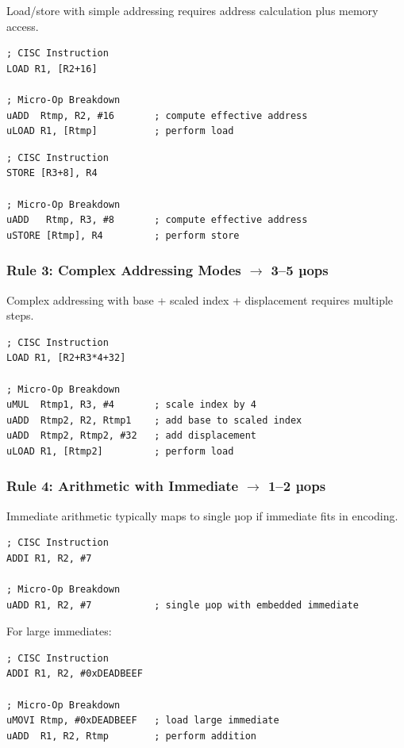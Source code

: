 \documentclass[12pt]{article}
\begin{document}
Load/store with simple addressing requires address calculation plus memory access.

\begin{lstlisting}
; CISC Instruction
LOAD R1, [R2+16]

; Micro-Op Breakdown
uADD  Rtmp, R2, #16       ; compute effective address
uLOAD R1, [Rtmp]          ; perform load
\end{lstlisting}

\begin{lstlisting}
; CISC Instruction
STORE [R3+8], R4

; Micro-Op Breakdown
uADD   Rtmp, R3, #8       ; compute effective address
uSTORE [Rtmp], R4         ; perform store
\end{lstlisting}

\subsubsection{Rule 3: Complex Addressing Modes $\rightarrow$ 3--5 µops}

Complex addressing with base + scaled index + displacement requires multiple steps.

\begin{lstlisting}
; CISC Instruction
LOAD R1, [R2+R3*4+32]

; Micro-Op Breakdown
uMUL  Rtmp1, R3, #4       ; scale index by 4
uADD  Rtmp2, R2, Rtmp1    ; add base to scaled index
uADD  Rtmp2, Rtmp2, #32   ; add displacement
uLOAD R1, [Rtmp2]         ; perform load
\end{lstlisting}

\subsubsection{Rule 4: Arithmetic with Immediate $\rightarrow$ 1--2 µops}

Immediate arithmetic typically maps to single µop if immediate fits in encoding.

\begin{lstlisting}
; CISC Instruction
ADDI R1, R2, #7

; Micro-Op Breakdown
uADD R1, R2, #7           ; single µop with embedded immediate
\end{lstlisting}

For large immediates:

\begin{lstlisting}
; CISC Instruction
ADDI R1, R2, #0xDEADBEEF

; Micro-Op Breakdown
uMOVI Rtmp, #0xDEADBEEF   ; load large immediate
uADD  R1, R2, Rtmp        ; perform addition
\end{lstlisting}
\end{document}
